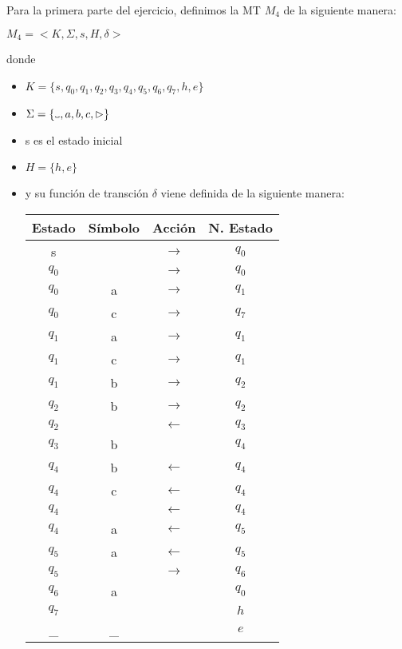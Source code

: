 \documentclass[11pt, a4paper, titlepage]{article}
\newcommand\vartextvisiblespace[1][.5em]{%
  \makebox[#1]{%
    \kern.07em
    \vrule height.3ex
    \hrulefill
    \vrule height.3ex
    \kern.07em
  }%
}
\begin{document}
Para la primera parte del ejercicio, definimos la MT $M_4$ de la siguiente
manera:

$ M_4 = < K, \Sigma, s, H, \delta >$

donde
\begin{itemize}
\item $ K = \{ s, q_0, q_1, q_2, q_3, q_4, q_5, q_6, q_7, h, e \}$
\item $ \Sigma = \{\vartextvisiblespace, a, b, c, \rhd \}$
\item s es el estado inicial
\item $ H = \{ h, e \}$
\item y su función de transción $\delta$ viene definida de la siguiente manera:
  \hfill \break
  \begin{center}
    \begin{tabular}{|| c c c c ||}
      \hline
      Estado & Símbolo & Acción & N. Estado \\ [0.5ex]
      \hline\hline
      s & \vartextvisiblespace & $\rightarrow$ & $q_0$ \\
      \hline
      $q_0$ & \vartextvisiblespace & $\rightarrow$ & $q_0$ \\
      \hline
      $q_0$ & a & $\rightarrow$ & $q_1$ \\
      \hline
      $q_0$ & c & $\rightarrow$ & $q_7$ \\
      \hline
      $q_1$ & a & $\rightarrow$ & $q_1$ \\
      \hline
      $q_1$ & c & $\rightarrow$ & $q_1$ \\
      \hline
      $q_1$ & b & $\rightarrow$ & $q_2$ \\
      \hline
      $q_2$ & b & $\rightarrow$ & $q_2$ \\
      \hline
      $q_2$ & \vartextvisiblespace & $\leftarrow$ & $q_3$ \\
      \hline
      $q_3$ & b & \vartextvisiblespace & $q_4$ \\
      \hline
      $q_4$ & b & $\leftarrow$ & $q_4$ \\
      \hline
      $q_4$ & c & $\leftarrow$ & $q_4$ \\
      \hline
      $q_4$ & \vartextvisiblespace & $\leftarrow$ & $q_4$ \\
      \hline
      $q_4$ & a & $\leftarrow$ & $q_5$ \\
      \hline
      $q_5$ & a & $\leftarrow$ & $q_5$ \\
      \hline
      $q_5$ & \vartextvisiblespace & $\rightarrow$ & $q_6$ \\
      \hline
      $q_6$ & a & \vartextvisiblespace & $q_0$ \\
      \hline
      $q_7$ & \vartextvisiblespace & \vartextvisiblespace & $h$ \\
      \hline
      \_ & \_ & \vartextvisiblespace & $e$ \\
      \hline
    \end{tabular}
\end{center}
\end{itemize}
\end{document}
